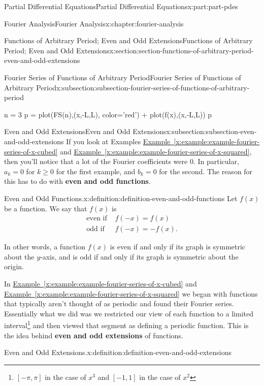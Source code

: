 \documentclass[oneside,10pt,]{book}
\newcommand{\xreffont}{\relax}
\newcommand{\terminology}[1]{\textbf{#1}}
\numberwithin{equation}{part}
\newcommand{\amp}{&}
\begin{document}
\begin{partptx}{Partial Differential Equations}{}{Partial Differential Equations}{}{}{x:part:part-pdes}
\begin{chapterptx}{Fourier Analysis}{}{Fourier Analysis}{}{}{x:chapter:fourier-analysis}
\begin{sectionptx}{Functions of Arbitrary Period; Even and Odd Extensions}{}{Functions of Arbitrary Period; Even and Odd Extensions}{}{}{x:section:section-functions-of-arbitrary-period-even-and-odd-extensions}
\begin{subsectionptx}{Fourier Series of Functions of Arbitrary Period}{}{Fourier Series of Functions of Arbitrary Period}{}{}{x:subsection:subsection-fourier-series-of-functions-of-arbitrary-period}
\begin{sageinput}
n = 3
p = plot(FS(n),(x,-L,L), color='red') + plot(f(x),(x,-L,L))
p
\end{sageinput}
\end{subsectionptx}
%
%
\typeout{************************************************}
\typeout{************************************************}
%
\begin{subsectionptx}{Even and Odd Extensions}{}{Even and Odd Extensions}{}{}{x:subsection:subsection-even-and-odd-extensions}
If you look at Examples \hyperref[x:example:example-fourier-series-of-x-cubed]{Example~{\xreffont\ref{x:example:example-fourier-series-of-x-cubed}}} and \hyperref[x:example:example-fourier-series-of-x-squared]{Example~{\xreffont\ref{x:example:example-fourier-series-of-x-squared}}}, then you'll notice that a lot of the Fourier coefficients were \(0\). In particular, \(a_{k} = 0\) for \(k\geq0\) for the first example, and \(b_{k}=0\) for the second. The reason for this has to do with \terminology{even and odd functions}.%
\begin{definition}{Even and Odd Functions.}{x:definition:definition-even-and-odd-functions}%
%
Let \(f(x)\) be a function. We say that \(f(x)\) is%
\begin{align*}
\text{even if } \amp f(-x) = f(x)\\
\text{odd if } \amp f(-x) = -f(x).
\end{align*}
%
\end{definition}
In other words, a function \(f(x)\) is even if and only if its graph is symmetric about the \(y\)-axis, and is odd if and only if its graph is symmetric about the origin.%
\par
In \hyperref[x:example:example-fourier-series-of-x-cubed]{Example~{\xreffont\ref{x:example:example-fourier-series-of-x-cubed}}} and \hyperref[x:example:example-fourier-series-of-x-squared]{Example~{\xreffont\ref{x:example:example-fourier-series-of-x-squared}}} we began with functions that typically aren't thought of as periodic and found their Fourier series. Essentially what we did was we restricted our view of each function to a limited interval\footnote{\([-\pi,\pi]\) in the case of \(x^{3}\) and \([-1,1]\) in the case of \(x^{2}\)\label{x:fn:footnote-periodic-extensions}} and then viewed that segment as defining a periodic function. This is the idea behind \terminology{even and odd extensions} of functions.%
\begin{definition}{Even and Odd Extensions.}{x:definition:definition-even-and-odd-extensions}%

\end{definition}
\end{subsectionptx}
\end{sectionptx}
\end{chapterptx}
\end{partptx}
\end{document}
